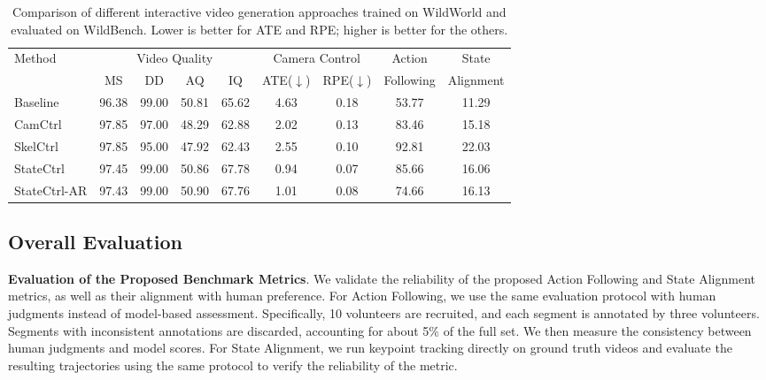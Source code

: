 \begin{table}[t]
\centering
\renewcommand{\arraystretch}{1.3}
\setlength{\tabcolsep}{5.0pt}
\caption{Comparison of different interactive video generation approaches trained on WildWorld and evaluated on WildBench. Lower is better for ATE and RPE; higher is better for the others.}
\begin{tabular}{l|cccc|cc|c|c}
\hline
\multirow{2}{*}{Method} 
& \multicolumn{4}{c|}{Video Quality} 
& \multicolumn{2}{c|}{Camera Control} 
& \multicolumn{1}{c|}{Action} 
& \multicolumn{1}{c}{State} \\
\cline{2-5}\cline{6-7}
& MS 
& DD 
& AQ 
& IQ
& ATE($\downarrow$)
& RPE($\downarrow$)
& \multicolumn{1}{c|}{Following}
& \multicolumn{1}{c}{Alignment} \\
\hline
Baseline & 96.38 & 99.00 & 50.81 & 65.62 & 4.63 & 0.18 & 53.77 & 11.29 \\
CamCtrl & 97.85 & 97.00 & 48.29 & 62.88 & 2.02 & 0.13 & 83.46 & 15.18 \\
SkelCtrl & 97.85 & 95.00 & 47.92 & 62.43 & 2.55 & 0.10 & 92.81 & 22.03 \\
StateCtrl & 97.45 & 99.00 & 50.86 & 67.78 & 0.94 & 0.07 & 85.66 & 16.06 \\
StateCtrl-AR & 97.43 & 99.00 & 50.90 & 67.76 & 1.01 & 0.08 & 74.66 & 16.13 \\
\hline
\end{tabular}
\label{tab:main_results}
\end{table}


\subsection{Overall Evaluation}

\noindent
\textbf{Evaluation of the Proposed Benchmark Metrics}.
We validate the reliability of the proposed Action Following and State Alignment metrics, as well as their alignment with human preference.
For Action Following, we use the same evaluation protocol with human judgments instead of model-based assessment. 
Specifically, 10 volunteers are recruited, and each segment is annotated by three volunteers.
Segments with inconsistent annotations are discarded, accounting for about 5\% of the full set. 
We then measure the consistency between human judgments and model scores.
For State Alignment, we run keypoint tracking directly on ground truth videos and evaluate the resulting trajectories using the same protocol to verify the reliability of the metric.

